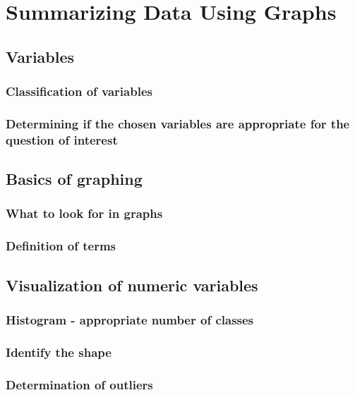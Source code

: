 \chapter{Summarizing Data Using Graphs}  %

\section{Variables}  %
    \subsection{Classification of variables}  %
    \subsection{Determining if the chosen variables are appropriate for the question of interest}  %

\section{Basics of graphing}  %
    \subsection{What to look for in graphs}  %
    \subsection{Definition of terms}  %


\section{Visualization of numeric variables}  %
    \subsection{Histogram - appropriate number of classes}  %
    \subsection{Identify the shape}  %
    \subsection{Determination of outliers}  %